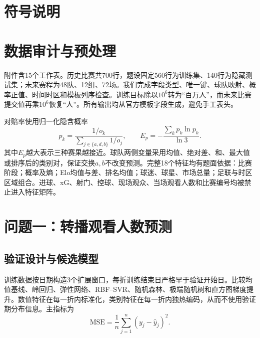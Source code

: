 \documentclass[UTF8,a4paper,zihao=-4,fontset=fandol]{ctexart}
\begin{document}
\section{符号说明}
\begin{modelnotation}
\end{modelnotation}

\section{数据审计与预处理}
附件含15个工作表。历史比赛共700行，题设固定560行为训练集、140行为隐藏测试集；未来赛程为48队、12组、72场。我们完成字段类型、唯一键、球队映射、概率正值、时间时区和模板列序检查。训练目标除以$10^6$转为“百万人”，而未来比赛提交值再乘$10^6$恢复“人”。所有输出均从官方模板字段生成，避免手工表头。

对赔率使用归一化隐含概率
\begin{equation}
 p_k=\frac{1/o_k}{\sum_{j\in\{a,d,b\}}1/o_j},\qquad
 E_p=-\frac{\sum_k p_k\ln p_k}{\ln 3}.
\end{equation}
其中$E_p$越大表示三种赛果越接近。球队两侧变量采用均值、绝对差、和、最大值或排序后的类别对，保证交换$a,b$不改变预测。完整18个特征均有题面依据：比赛阶段；概率及熵；Elo均值与差、排名均值；球迷、球星、市场总量；足联与时区区域组合。进球、xG、射门、控球、现场观众、当场观看人数和比赛编号均被禁止进入特征矩阵。

\section{问题一：转播观看人数预测}
\subsection{验证设计与候选模型}
训练数据按日期构造3个扩展窗口，每折训练结束日严格早于验证开始日。比较均值基线、岭回归、弹性网络、RBF--SVR、随机森林、极端随机树和直方图梯度提升。数值特征在每一折内标准化，类别特征在每一折内独热编码，从而不使用验证期分布信息。主指标为
\begin{equation}
 \mathrm{MSE}=\frac{1}{n}\sum_{j=1}^{n}(y_j-\hat y_j)^2.
\end{equation}
\end{document}
